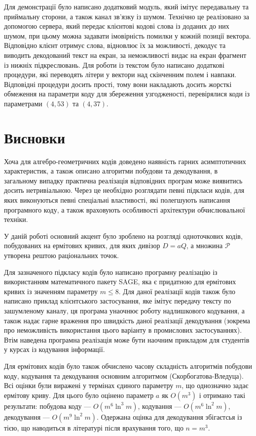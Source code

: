 \documentclass[a4paper,14pt,oneside]{extarticle}
\begin{document}
Для демонстрації було написано додатковий модуль, який імітує передавальну та приймальну сторони, а також канал зв'язку із шумом. Технічно це 
реалізовано за допомогою сервера, який передає клієнтові кодові слова із доданих до них шумом, при цьому можна задавати імовірність помилки у 
кожній позиції вектора. Відповідно клієнт отримує слова, відновлює їх за можливості, декодує та виводить декодований текст на екран, 
за неможливості видає на екран фрагмент із нижніх підкреслювань. Для роботи із текстом було написано додаткові процедури, які переводять літери у 
вектори над скінченним полем і навпаки. Відповідні процедури досить прості, тому вони накладають досить жорсткі обмеження на параметри коду для 
збереження узгодженості, перевірялися коди із параметрами $(4, 53)$ та $(4, 37)$.

\pagebreak
\section*{Висновки}
Хоча для алгебро-геометричних кодів доведено наявність гарних асимптотичних характеристик, а також описано алгоритми побудови та декодування,
в загальному випадку практична реалізація відповідних програм може виявитись досить нетривіальною. Через це необхідно розглядати певні підкласи 
кодів, для яких виконуються певні спеціальні властивості, які полегшують написання програмного коду, а також враховують особливості архітектури 
обчислювальної техніки.

У даній роботі основний акцент було зроблено на розгляді одноточкових кодів, побудованих на ермітових кривих, для яких дивізор $D=aQ$, а 
множина $\mathcal{P}$ утворена рештою раціональних точок.

Для зазначеного підкласу кодів було написано програмну реалізацію із використанням математичного пакету SAGE, яка є придатною для ермітових кривих із значенням 
параметру $m \le 8$. Для даної реалізації кодів також було написано приклад клієнтського застосування, яке імітує передачу тексту по зашумленому каналу, ця 
програма унаочнює роботу надлишкового кодування, а також надає гарне враження про швидкість даної реалізації декодування (зокрема про неможливість використання 
цього варіанту в промислових застосуваннях). Втім наведена програмна реалізація може бути наочним прикладом для студентів у курсах із кодування інформації.

Для ермітових кодів було також обчислено часову складність алгоритмів побудови коду, кодування та декодування основним алгоритмом (Скорбогатова-Вледуца). 
Всі оцінки були виражені у термінах єдиного параметру $m$, що однозначно задає ермітову криву. Для цього було оцінено параметр $a$ як $O(m^3)$ і отримано 
такі результати: побудова коду --- $O(m^6 \ln^3 m)$, кодування --- $O(m^6 \ln^2 m)$, декодування --- $O(m^9 \ln^2 m)$. Одержана оцінка для декодування 
збігаєтсья із тією, що наводиться в літературі після врахування того, що $n=m^3$.

\nocite{*}

\clearpage
{}
{}

\end{document}
